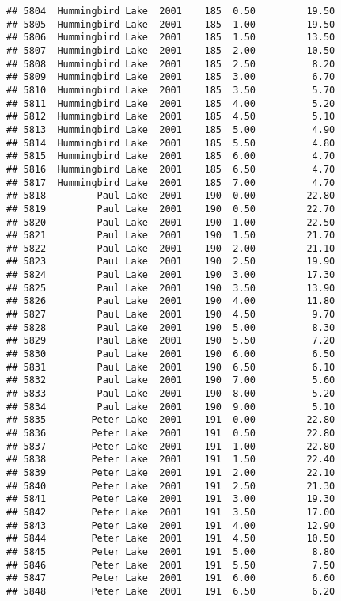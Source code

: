\documentclass[
]{article}
\begin{document}
\begin{verbatim}
## 5804  Hummingbird Lake  2001    185  0.50         19.50
## 5805  Hummingbird Lake  2001    185  1.00         19.50
## 5806  Hummingbird Lake  2001    185  1.50         13.50
## 5807  Hummingbird Lake  2001    185  2.00         10.50
## 5808  Hummingbird Lake  2001    185  2.50          8.20
## 5809  Hummingbird Lake  2001    185  3.00          6.70
## 5810  Hummingbird Lake  2001    185  3.50          5.70
## 5811  Hummingbird Lake  2001    185  4.00          5.20
## 5812  Hummingbird Lake  2001    185  4.50          5.10
## 5813  Hummingbird Lake  2001    185  5.00          4.90
## 5814  Hummingbird Lake  2001    185  5.50          4.80
## 5815  Hummingbird Lake  2001    185  6.00          4.70
## 5816  Hummingbird Lake  2001    185  6.50          4.70
## 5817  Hummingbird Lake  2001    185  7.00          4.70
## 5818         Paul Lake  2001    190  0.00         22.80
## 5819         Paul Lake  2001    190  0.50         22.70
## 5820         Paul Lake  2001    190  1.00         22.50
## 5821         Paul Lake  2001    190  1.50         21.70
## 5822         Paul Lake  2001    190  2.00         21.10
## 5823         Paul Lake  2001    190  2.50         19.90
## 5824         Paul Lake  2001    190  3.00         17.30
## 5825         Paul Lake  2001    190  3.50         13.90
## 5826         Paul Lake  2001    190  4.00         11.80
## 5827         Paul Lake  2001    190  4.50          9.70
## 5828         Paul Lake  2001    190  5.00          8.30
## 5829         Paul Lake  2001    190  5.50          7.20
## 5830         Paul Lake  2001    190  6.00          6.50
## 5831         Paul Lake  2001    190  6.50          6.10
## 5832         Paul Lake  2001    190  7.00          5.60
## 5833         Paul Lake  2001    190  8.00          5.20
## 5834         Paul Lake  2001    190  9.00          5.10
## 5835        Peter Lake  2001    191  0.00         22.80
## 5836        Peter Lake  2001    191  0.50         22.80
## 5837        Peter Lake  2001    191  1.00         22.80
## 5838        Peter Lake  2001    191  1.50         22.40
## 5839        Peter Lake  2001    191  2.00         22.10
## 5840        Peter Lake  2001    191  2.50         21.30
## 5841        Peter Lake  2001    191  3.00         19.30
## 5842        Peter Lake  2001    191  3.50         17.00
## 5843        Peter Lake  2001    191  4.00         12.90
## 5844        Peter Lake  2001    191  4.50         10.50
## 5845        Peter Lake  2001    191  5.00          8.80
## 5846        Peter Lake  2001    191  5.50          7.50
## 5847        Peter Lake  2001    191  6.00          6.60
## 5848        Peter Lake  2001    191  6.50          6.20

\end{verbatim}
\end{document}
